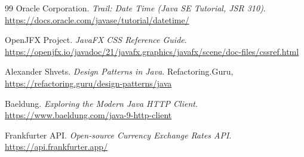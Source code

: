 \documentclass[11pt,a4paper,openright]{report}
\begin{document}
\begin{thebibliography}{99}
  Oracle Corporation.
  \newblock \emph{Trail: Date Time (Java SE Tutorial, JSR 310)}.
  \newblock \url{https://docs.oracle.com/javase/tutorial/datetime/}

  OpenJFX Project.
  \newblock \emph{JavaFX CSS Reference Guide}.
  \newblock \url{https://openjfx.io/javadoc/21/javafx.graphics/javafx/scene/doc-files/cssref.html}

  Alexander Shvets.
  \newblock \emph{Design Patterns in Java}.
  \newblock Refactoring.Guru, \url{https://refactoring.guru/design-patterns/java}

  Baeldung.
  \newblock \emph{Exploring the Modern Java HTTP Client}.
  \newblock \url{https://www.baeldung.com/java-9-http-client}

  Frankfurter API.
  \newblock \emph{Open-source Currency Exchange Rates API}.
  \newblock \url{https://api.frankfurter.app/}

\end{thebibliography}
\end{document}

